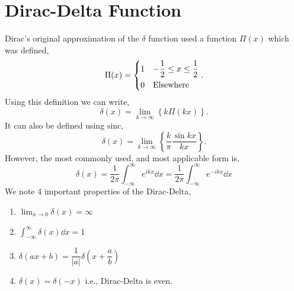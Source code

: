 \documentclass{book}
\begin{document}
\section{Dirac-Delta Function}
Dirac's original approximation of the $\delta$ function used a function $\Pi(x)$ which was defined,
\begin{equation}
	\Pi(x) = \begin{dcases}
		1 & -\frac{1}{2} \leq x \leq \frac{1}{2} \\
		0 & \text{Elsewhere}
	\end{dcases}.
\end{equation}
Using this definition we can write,
\begin{equation}
	\delta(x) = \lim_{k \to \infty} \left\{k\Pi(kx)\right\}.
\end{equation}
It can also be defined using $\mathrm{sinc}$,
\begin{equation}
	\delta(x) = \lim_{k \to \infty}\left\{\frac{k}{\pi}\frac{\sin{kx}}{kx}\right\}.
\end{equation}
However, the most commonly used, and most applicable form is,
\begin{equation}
	\boxed{\delta(x) = \frac{1}{2\pi}\int_{-\infty}^{\infty}e^{ikx}\dd{x} = \frac{1}{2\pi}\int_{-\infty}^{\infty}e^{-ikx}\dd{x}}
\end{equation}
We note 4 important properties of the Dirac-Delta,
\begin{enumerate}
	\item $\displaystyle \lim_{x \to 0}\delta(x) = \infty$ 
	\item $\displaystyle \int_{-\infty}^{\infty}\delta(x)\dd{x} = 1$
	\item $\displaystyle \delta(ax + b) = \dfrac{1}{|a|}\delta\left(x + \dfrac{a}{b}\right)$
	\item $\delta(x) = \delta(-x)$ i.e., Dirac-Delta is even.
\end{enumerate}
\end{document}
